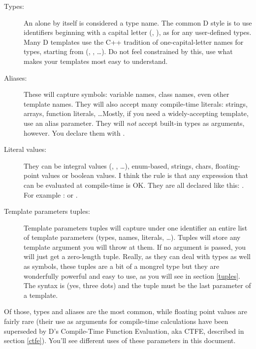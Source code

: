 \begin{description}

\item[Types:] 

An  alone by itself is considered a type name. The common D style is to use identifiers beginning with a capital letter (, ), as for any user-defined types. Many D templates use the C++ tradition of one-capital-letter names for types, starting from  (, , \ldots). Do not feel constrained by this, use what makes your templates most easy to understand.

\item[Aliases: ] 

These will capture symbols: variable names, class names, even other template names. They will also accept many compile-time literals: strings, arrays, function literals, \ldots Mostly, if you need a widely-accepting template, use an alias parameter. They will \emph{not} accept built-in types as arguments, however. You declare them with  .

\item[Literal values:] 

They can be integral values (, , \ldots), enum-based, strings, chars, floating-point values or boolean values. I think the rule is that any expression that can be evaluated at compile-time is OK. They are all declared like this:  . For example :   or  .

\item[Template parameters tuples:] 

Template parameters tuples will capture un\-der one id\-en\-ti\-fier an en\-ti\-re list of tem\-plate pa\-ra\-me\-ters (types, names, literals, \ldots). Tuples will store any template argument you will throw at them. If no argument is passed, you will just get a zero-length tuple. Really, as they can deal with types as well as symbols, these tuples are a bit of a mongrel type but they are wonderfully powerful and easy to use, as you will see in section \ref{tuples}. The syntax is  (yes, three dots) and the tuple must be the last parameter of a template. 
\end{description}

Of those, types and aliases are the most common, while floating point values are fairly rare (their use as arguments for compile-time calculations have been superseded by D's Compile-Time Function Evaluation, aka CTFE, described in section \ref{ctfe}). You'll see different uses of these parameters in this document.

